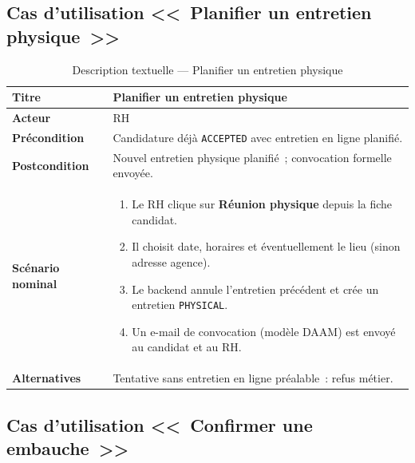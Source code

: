 \subsection{Cas d'utilisation <<~Planifier un entretien physique~>>}

\begin{table}[htbp]
  \centering
  \small
  \caption{Description textuelle --- Planifier un entretien physique}
  \label{tab:uc-physical-interview}
  \begin{tabular}{|p{3.0cm}|p{10.2cm}|}
    \hline
    \textbf{Titre} & Planifier un entretien physique \\
    \hline
    \textbf{Acteur} & RH \\
    \hline
    \textbf{Précondition} & Candidature déjà \texttt{ACCEPTED} avec entretien en ligne planifié. \\
    \hline
    \textbf{Postcondition} & Nouvel entretien physique planifié~; convocation formelle envoyée. \\
    \hline
    \textbf{Scénario nominal}
    &
    \begin{enumerate}[leftmargin=*,itemsep=0.15em,topsep=0.2em]
      \item Le RH clique sur \textbf{Réunion physique} depuis la fiche candidat.
      \item Il choisit date, horaires et éventuellement le lieu (sinon adresse agence).
      \item Le backend annule l'entretien précédent et crée un entretien
            \texttt{PHYSICAL}.
      \item Un e-mail de convocation (modèle DAAM) est envoyé au candidat et au RH.
    \end{enumerate}
    \\
    \hline
    \textbf{Alternatives}
    & Tentative sans entretien en ligne préalable~: refus métier. \\
    \hline
  \end{tabular}
\end{table}


\subsection{Cas d'utilisation <<~Confirmer une embauche~>>}

